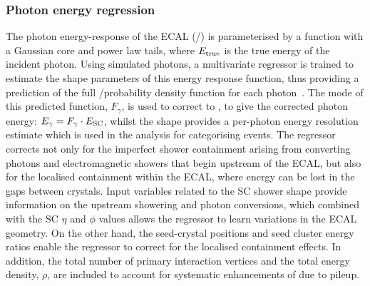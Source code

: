 \subsubsection{Photon energy regression}
The photon energy-response of the ECAL (\Etrue/\Eraw) is parameterised by a function with a Gaussian core and power law tails, where $E_{\mathrm{true}}$ is the true energy of the incident photon. Using simulated photons, a multivariate regressor is trained to estimate the shape parameters of this energy response function, thus providing a prediction of the full \Etrue/\Eraw probability density function for each photon~\cite{Khachatryan:2015iwa}. The mode of this predicted function, $F_{\gamma}$, is used to correct \Eraw to \Etrue, to give the corrected photon energy: $E_{\gamma} = F_{\gamma}\cdot E_{\rm{SC}}$, whilst the shape provides a per-photon energy resolution estimate which is used in the \Hgg analysis for categorising events. The regressor corrects not only for the imperfect shower containment arising from converting photons and electromagnetic showers that begin upstream of the ECAL, but also for the localised containment within the ECAL, where energy can be lost in the gaps between crystals. Input variables related to the SC shower shape provide information on the upstream showering and photon conversions, which combined with the SC $\eta$ and $\phi$ values allows the regressor to learn variations in the ECAL geometry. On the other hand, the seed-crystal positions and seed cluster energy ratios enable the regressor to correct for the localised containment effects. In addition, the total number of primary interaction vertices and the total energy density, $\rho$, are included to account for systematic enhancements of \Eraw due to pileup. 



